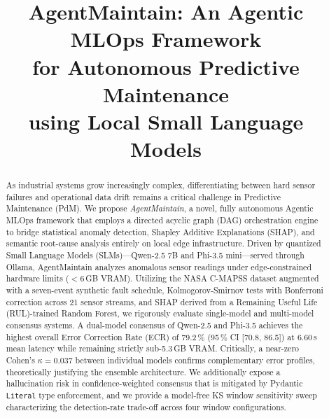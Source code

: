 \documentclass[conference, 10pt]{IEEEtran}
\begin{document}
\title{AgentMaintain: An Agentic MLOps Framework \\ for Autonomous Predictive Maintenance \\ using Local Small Language Models
}

\author{
}

\maketitle

\begin{abstract}
As industrial systems grow increasingly complex, differentiating between hard sensor failures and operational data drift remains a critical challenge in Predictive Maintenance (PdM). We propose \textit{AgentMaintain}, a novel, fully autonomous Agentic MLOps framework that employs a directed acyclic graph (DAG) orchestration engine to bridge statistical anomaly detection, Shapley Additive Explanations (SHAP), and semantic root-cause analysis entirely on local edge infrastructure. Driven by quantized Small Language Models (SLMs)---Qwen-2.5 7B and Phi-3.5 mini---served through Ollama, AgentMaintain analyzes anomalous sensor readings under edge-constrained hardware limits ($<$6\,GB VRAM). Utilizing the NASA C-MAPSS dataset augmented with a seven-event synthetic fault schedule, Kolmogorov-Smirnov tests with Bonferroni correction across 21 sensor streams, and SHAP derived from a Remaining Useful Life (RUL)-trained Random Forest, we rigorously evaluate single-model and multi-model consensus systems. A dual-model consensus of Qwen-2.5 and Phi-3.5 achieves the highest overall Error Correction Rate (ECR) of 79.2\,\% (95\,\% CI [70.8, 86.5]) at 6.60\,s mean latency while remaining strictly sub-5.3\,GB VRAM. Critically, a near-zero Cohen's $\kappa = 0.037$ between individual models confirms complementary error profiles, theoretically justifying the ensemble architecture. We additionally expose a hallucination risk in confidence-weighted consensus that is mitigated by Pydantic \texttt{Literal} type enforcement, and we provide a model-free KS window sensitivity sweep characterizing the detection-rate trade-off across four window configurations.
\end{abstract}
\end{document}
